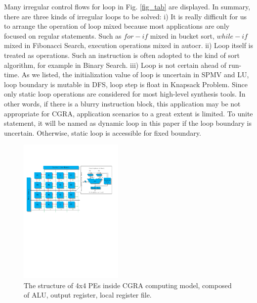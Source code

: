 \documentclass[10pt, conference, compsocconf]{IEEEtran}
\begin{document}
Many irregular control flows for loop in Fig. \ref{fig_tab} are displayed. In summary, there are three kinds of irregular loops to be solved: i) It is really difficult for us to arrange the operation of loop mixed because most applications are only focused on regular statements. Such as $for-if$ mixed in bucket sort, $while-if$ mixed in Fibonacci Search, execution operations mixed in autocr. ii) Loop itself is treated as operations. Such an instruction is often adopted to the kind of sort algorithm, for example in Binary Search. iii) Loop is not certain ahead of run-time. As we listed, the initialization value of loop is uncertain in SPMV and LU, loop boundary is mutable in DFS, loop step is float in Knapsack Problem. Since only static loop operations are considered for most high-level synthesis tools. In other words, if there is a blurry instruction block, this application may be not appropriate for CGRA, application scenarios to a great extent is limited. To unite statement, it will be named as dynamic loop in this paper if the loop boundary is uncertain. Otherwise, static loop is accessible for fixed boundary.
\begin{figure}[!t]
	\centering
	\includegraphics[width=0.45\textwidth]{fi/Pe_arrays.pdf}
	\caption{The structure of 4x4 PEs inside CGRA computing model, composed of ALU, output register, local register file.}
	\label{fig_pearray}
\end{figure}
%
%
%
\end{document}
